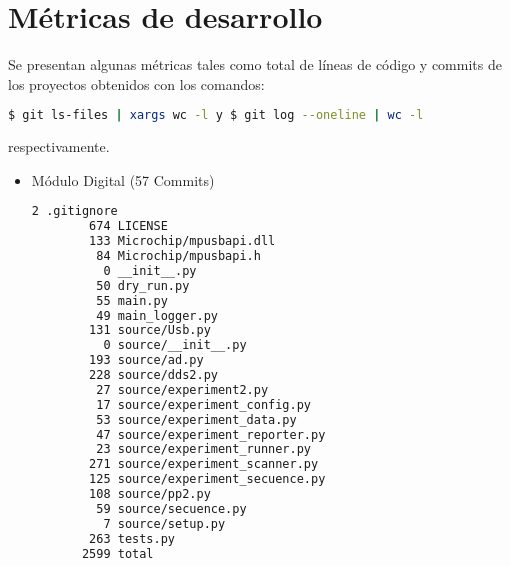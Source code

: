 \section{M\'etricas de desarrollo}

Se presentan algunas m\'etricas tales como total de l\'ineas de c\'odigo y commits de los proyectos
obtenidos con los comandos:
\begin{lstlisting}[language=bash]
    $ git ls-files | xargs wc -l y $ git log --oneline | wc -l
\end{lstlisting}
respectivamente.
  
\begin{itemize}
\item Módulo Digital (57 Commits)
\begin{lstlisting}[language=bash]
        2 .gitignore
        674 LICENSE
        133 Microchip/mpusbapi.dll
         84 Microchip/mpusbapi.h
          0 __init__.py
         50 dry_run.py
         55 main.py
         49 main_logger.py
        131 source/Usb.py
          0 source/__init__.py
        193 source/ad.py
        228 source/dds2.py
         27 source/experiment2.py
         17 source/experiment_config.py
         53 source/experiment_data.py
         47 source/experiment_reporter.py
         23 source/experiment_runner.py
        271 source/experiment_scanner.py
        125 source/experiment_secuence.py
        108 source/pp2.py
         59 source/secuence.py
          7 source/setup.py
        263 tests.py
       2599 total
    \end{lstlisting}


\end{itemize}
